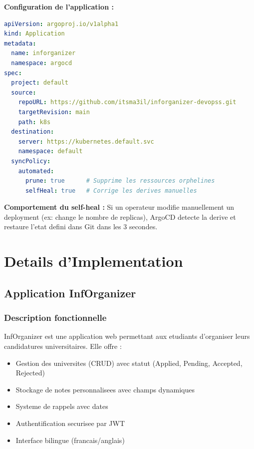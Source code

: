\documentclass[12pt,a4paper,french]{report}
\begin{document}
\textbf{Configuration de l'application :}

\begin{lstlisting}[language=yaml, caption=inforganizer-app.yaml]
apiVersion: argoproj.io/v1alpha1
kind: Application
metadata:
  name: inforganizer
  namespace: argocd
spec:
  project: default
  source:
    repoURL: https://github.com/itsma3il/inforganizer-devopss.git
    targetRevision: main
    path: k8s
  destination:
    server: https://kubernetes.default.svc
    namespace: default
  syncPolicy:
    automated:
      prune: true      # Supprime les ressources orphelines
      selfHeal: true   # Corrige les derives manuelles
\end{lstlisting}

\textbf{Comportement du self-heal :} Si un operateur modifie manuellement un deployment (ex: change le nombre de replicas), ArgoCD detecte la derive et restaure l'etat defini dans Git dans les 3 secondes.

\chapter{Details d'Implementation}

\section{Application InfOrganizer}

\subsection{Description fonctionnelle}

InfOrganizer est une application web permettant aux etudiants d'organiser leurs candidatures universitaires. Elle offre :

\begin{itemize}
    \item Gestion des universites (CRUD) avec statut (Applied, Pending, Accepted, Rejected)
    \item Stockage de notes personnalisees avec champs dynamiques
    \item Systeme de rappels avec dates
    \item Authentification securisee par JWT
    \item Interface bilingue (francais/anglais)
\end{itemize}
\end{document}
